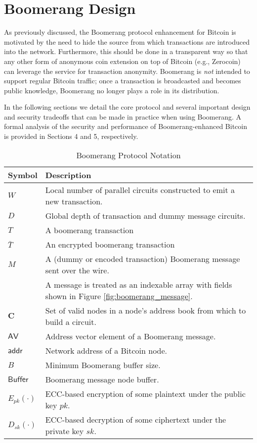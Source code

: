 \section{Boomerang Design} \label{sec:design}

As previously discussed, the Boomerang protocol enhancement for Bitcoin is motivated by the need to hide the source from which transactions are introduced into the network. Furthermore, this should be done in a transparent way so that any other form of anonymous coin extension on top of Bitcoin (e.g., Zerocoin) can leverage the service for transaction anonymity. Boomerang is \emph{not} intended to support regular Bitcoin traffic; once a transaction is broadcasted and becomes public knowledge, Boomerang no longer plays a role in its distribution. 

In the following sections we detail the core protocol and several important design and security tradeoffs that can be made in practice when using Boomerang. A formal analysis of the security and performance of Boomerang-enhanced Bitcoin is provided in Sections 4 and 5, respectively. 

\begin{table*}[ht!]
\begin{center}
\caption{Boomerang Protocol Notation}
\label{tab:notation}
	\begin{tabular}{|l|l|}\hline
	\textbf{Symbol} & \textbf{Description} \\ \hline
	$W$ & Local number of parallel circuits constructed to emit a new transaction. \\
	$D$ & Global depth of transaction and dummy message circuits. \\
	$T$ & A boomerang transaction \\ 
	$\bar{T}$ & An encrypted boomerang transaction \\ 
	$M$ & A (dummy or encoded transaction) Boomerang message sent over the wire. \\
	~ & A message is treated as an indexable array with fields shown in Figure \ref{fig:boomerang_message}. \\
	$\mathbf{C}$ & Set of valid nodes in a node's address book from which to build a circuit. \\
	$\mathsf{AV}$ & Address vector element of a Boomerang message. \\
	$\mathsf{addr}$ & Network address of a Bitcoin node. \\
	$B$ & Minimum Boomerang buffer size. \\
	$\mathsf{Buffer}$ & Boomerang message node buffer. \\
	$E_{pk}(\cdot)$ & ECC-based encryption of some plaintext under the public key $pk$. \\	
	$D_{sk}(\cdot)$ & ECC-based decryption of some ciphertext under the private key $sk$. \\ \hline
	\end{tabular}
\end{center}
\end{table*}

